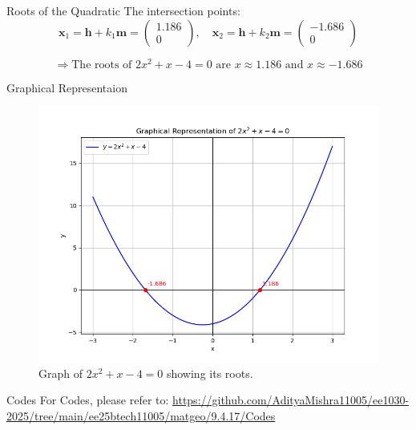 \documentclass{beamer}
\newcommand{\myvec}[1]{\begin{pmatrix}#1\end{pmatrix}}
\let\vec\mathbf
\begin{document}
\begin{frame}{Roots of the Quadratic}
The intersection points:
\[
\vec{x}_1 = \vec{h} + k_1 \vec{m} = \myvec{1.186 \\ 0}, \quad
\vec{x}_2 = \vec{h} + k_2 \vec{m} = \myvec{-1.686 \\ 0}
\]

\[
\Rightarrow \text{The roots of } 2x^2 + x - 4 = 0 \text{ are } x \approx 1.186 \text{ and } x \approx -1.686
\]
\end{frame}
\begin{frame}{Graphical Representaion}
\begin{figure}[h!]
    \centering
    \includegraphics[height=0.5\textheight, keepaspectratio]{Figs/Figure_1.png}
    \caption{Graph of $2x^2 + x - 4 = 0$ showing its roots.}
    \label{figure_1}
\end{figure}
\end{frame}


\begin{frame}[fragile]{Codes}
For Codes, please refer to:
\url{https://github.com/AdityaMishra11005/ee1030-2025/tree/main/ee25btech11005/matgeo/9.4.17/Codes}
\end{frame}
\end{document}
